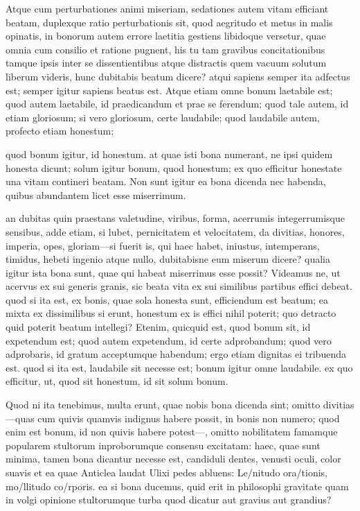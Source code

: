  Atque cum perturbationes animi miseriam, sedationes autem vitam efficiant beatam, duplexque ratio perturbationis sit, quod aegritudo et metus in malis opinatis, in bonorum autem errore laetitia gestiens libidoque versetur, quae omnia cum consilio et ratione pugnent, his tu tam gravibus concitationibus tamque ipsis inter se dissentientibus atque distractis quem vacuum solutum liberum videris, hunc dubitabis beatum dicere? atqui sapiens semper ita adfectus est; semper igitur sapiens beatus est. Atque etiam omne bonum laetabile est; quod autem laetabile, id praedicandum et prae se ferendum; quod tale autem, id etiam gloriosum; si vero gloriosum, certe laudabile; quod laudabile autem, profecto etiam honestum;

 quod bonum igitur, id honestum. at quae isti bona numerant, ne ipsi quidem honesta dicunt; solum igitur bonum, quod honestum; ex quo efficitur honestate una vitam contineri beatam. Non sunt igitur ea bona dicenda nec habenda, quibus abundantem licet esse miserrimum.

 an dubitas quin praestans valetudine, viribus, forma, acerrumis integerrumisque sensibus, adde etiam, si lubet, pernicitatem et velocitatem, da divitias, honores, imperia, opes, gloriam—si fuerit is, qui haec habet, iniustus, intemperans, timidus, hebeti ingenio atque nullo, dubitabisne eum miserum dicere? qualia igitur ista bona sunt, quae qui habeat miserrimus esse possit? Videamus ne, ut acervus ex sui generis granis, sic beata vita ex sui similibus partibus effici debeat. quod si ita est, ex bonis, quae sola honesta sunt, efficiendum est beatum; ea mixta ex dissimilibus si erunt, honestum ex is effici nihil poterit; quo detracto quid poterit beatum intellegi? Etenim, quicquid est, quod bonum sit, id expetendum est; quod autem expetendum, id certe adprobandum; quod vero adprobaris, id gratum acceptumque habendum; ergo etiam dignitas ei tribuenda est. quod si ita est, laudabile sit necesse est; bonum igitur omne laudabile. ex quo efficitur, ut, quod sit honestum, id sit solum bonum.

 Quod ni ita tenebimus, multa erunt, quae nobis bona dicenda sint; omitto divitias—quas cum quivis quamvis indignus habere possit, in bonis non numero; quod enim est bonum, id non quivis habere potest—, omitto nobilitatem famamque popularem stultorum inproborumque consensu excitatam: haec, quae sunt minima, tamen bona dicantur necesse est, candiduli dentes, venusti oculi, color suavis et ea quae Anticlea laudat Ulixi pedes abluens: Le/nitudo ora/tionis, mo/llitudo co/rporis. ea si bona ducemus, quid erit in philosophi gravitate quam in volgi opinione stultorumque turba quod dicatur aut gravius aut grandius?

